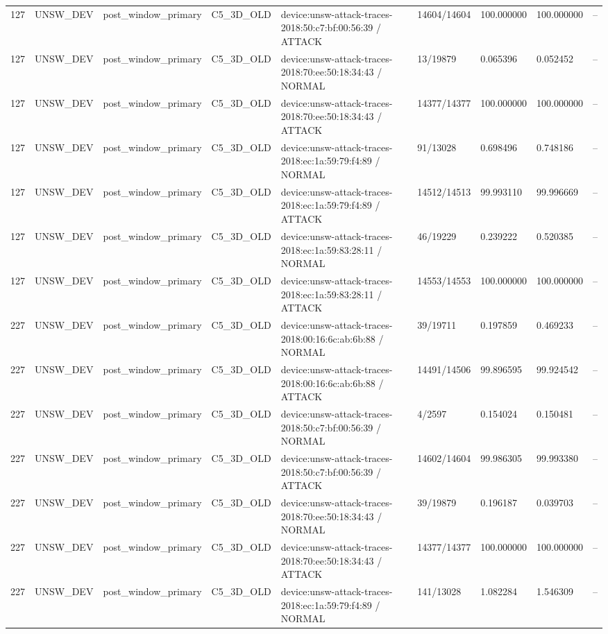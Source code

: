\begin{tabular}{lllllllll}
127 & UNSW\_DEV & post\_window\_primary & C5\_3D\_OLD & device:unsw-attack-traces-2018:50:c7:bf:00:56:39 / ATTACK & 14604/14604 & 100.000000 & 100.000000 & -- \\
127 & UNSW\_DEV & post\_window\_primary & C5\_3D\_OLD & device:unsw-attack-traces-2018:70:ee:50:18:34:43 / NORMAL & 13/19879 & 0.065396 & 0.052452 & -- \\
127 & UNSW\_DEV & post\_window\_primary & C5\_3D\_OLD & device:unsw-attack-traces-2018:70:ee:50:18:34:43 / ATTACK & 14377/14377 & 100.000000 & 100.000000 & -- \\
127 & UNSW\_DEV & post\_window\_primary & C5\_3D\_OLD & device:unsw-attack-traces-2018:ec:1a:59:79:f4:89 / NORMAL & 91/13028 & 0.698496 & 0.748186 & -- \\
127 & UNSW\_DEV & post\_window\_primary & C5\_3D\_OLD & device:unsw-attack-traces-2018:ec:1a:59:79:f4:89 / ATTACK & 14512/14513 & 99.993110 & 99.996669 & -- \\
127 & UNSW\_DEV & post\_window\_primary & C5\_3D\_OLD & device:unsw-attack-traces-2018:ec:1a:59:83:28:11 / NORMAL & 46/19229 & 0.239222 & 0.520385 & -- \\
127 & UNSW\_DEV & post\_window\_primary & C5\_3D\_OLD & device:unsw-attack-traces-2018:ec:1a:59:83:28:11 / ATTACK & 14553/14553 & 100.000000 & 100.000000 & -- \\
227 & UNSW\_DEV & post\_window\_primary & C5\_3D\_OLD & device:unsw-attack-traces-2018:00:16:6c:ab:6b:88 / NORMAL & 39/19711 & 0.197859 & 0.469233 & -- \\
227 & UNSW\_DEV & post\_window\_primary & C5\_3D\_OLD & device:unsw-attack-traces-2018:00:16:6c:ab:6b:88 / ATTACK & 14491/14506 & 99.896595 & 99.924542 & -- \\
227 & UNSW\_DEV & post\_window\_primary & C5\_3D\_OLD & device:unsw-attack-traces-2018:50:c7:bf:00:56:39 / NORMAL & 4/2597 & 0.154024 & 0.150481 & -- \\
227 & UNSW\_DEV & post\_window\_primary & C5\_3D\_OLD & device:unsw-attack-traces-2018:50:c7:bf:00:56:39 / ATTACK & 14602/14604 & 99.986305 & 99.993380 & -- \\
227 & UNSW\_DEV & post\_window\_primary & C5\_3D\_OLD & device:unsw-attack-traces-2018:70:ee:50:18:34:43 / NORMAL & 39/19879 & 0.196187 & 0.039703 & -- \\
227 & UNSW\_DEV & post\_window\_primary & C5\_3D\_OLD & device:unsw-attack-traces-2018:70:ee:50:18:34:43 / ATTACK & 14377/14377 & 100.000000 & 100.000000 & -- \\
227 & UNSW\_DEV & post\_window\_primary & C5\_3D\_OLD & device:unsw-attack-traces-2018:ec:1a:59:79:f4:89 / NORMAL & 141/13028 & 1.082284 & 1.546309 & -- \\

\end{tabular}
